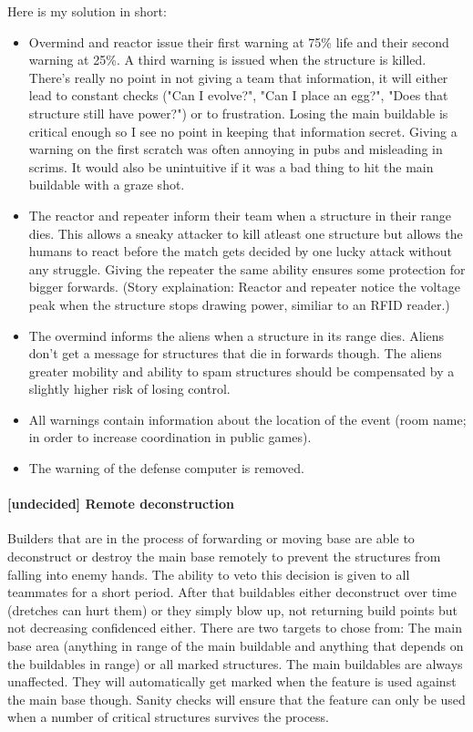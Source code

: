\documentclass{scrartcl}
\newcommand{\undecided}[0]{\textcolor{undecided}{\textbf{[undecided] }}}
\begin{document}
Here is my solution in short:

\begin{itemize}
\item Overmind and reactor issue their first warning at 75\% life and their second warning at 25\%. A third warning is issued when the structure is killed. There's really no point in not giving a team that information, it will either lead to constant checks ("Can I evolve?", "Can I place an egg?", "Does that structure still have power?") or to frustration. Losing the main buildable is critical enough so I see no point in keeping that information secret. Giving a warning on the first scratch was often annoying in pubs and misleading in scrims. It would also be unintuitive if it was a bad thing to hit the main buildable with a graze shot.
\item The reactor and repeater inform their team when a structure in their range dies. This allows a sneaky attacker to kill atleast one structure but allows the humans to react before the match gets decided by one lucky attack without any struggle. Giving the repeater the same ability ensures some protection for bigger forwards. (Story explaination: Reactor and repeater notice the voltage peak when the structure stops drawing power, similiar to an RFID reader.)
\item The overmind informs the aliens when a structure in its range dies. Aliens don't get a message for structures that die in forwards though. The aliens greater mobility and ability to spam structures should be compensated by a slightly higher risk of losing control.
\item All warnings contain information about the location of the event (room name; in order to increase coordination in public games).
\item The warning of the defense computer is removed.
\end{itemize}

\paragraph{\undecided Remote deconstruction}

Builders that are in the process of forwarding or moving base are able to deconstruct or destroy the main base remotely to prevent the structures from falling into enemy hands. The ability to veto this decision is given to all teammates for a short period. After that buildables either deconstruct over time (dretches can hurt them) or they simply blow up, not returning build points but not decreasing confidenced either. There are two targets to chose from: The main base area (anything in range of the main buildable and anything that depends on the buildables in range) or all marked structures. The main buildables are always unaffected. They will automatically get marked when the feature is used against the main base though. Sanity checks will ensure that the feature can only be used when a number of critical structures survives the process.
\end{document}
